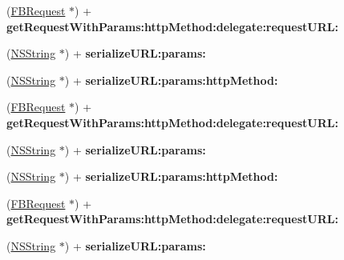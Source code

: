 \begin{DoxyCompactItemize}
\item 
\hypertarget{interface_f_b_request_ad72a5d444c91c0d8360b14c50ea050c4}{
(\hyperlink{interface_f_b_request}{\-F\-B\-Request} $\ast$) + {\bfseries get\-Request\-With\-Params\-:http\-Method\-:delegate\-:request\-U\-R\-L\-:}}
\label{interface_f_b_request_ad72a5d444c91c0d8360b14c50ea050c4}

\item 
\hypertarget{interface_f_b_request_aee7086d7ad0b6187567f27e50e5200f4}{
(\hyperlink{class_n_s_string}{\-N\-S\-String} $\ast$) + {\bfseries serialize\-U\-R\-L\-:params\-:}}
\label{interface_f_b_request_aee7086d7ad0b6187567f27e50e5200f4}

\item 
\hypertarget{interface_f_b_request_a4d464c3f3ee693fd58765836ac711dcd}{
(\hyperlink{class_n_s_string}{\-N\-S\-String} $\ast$) + {\bfseries serialize\-U\-R\-L\-:params\-:http\-Method\-:}}
\label{interface_f_b_request_a4d464c3f3ee693fd58765836ac711dcd}

\item 
\hypertarget{interface_f_b_request_ad72a5d444c91c0d8360b14c50ea050c4}{
(\hyperlink{interface_f_b_request}{\-F\-B\-Request} $\ast$) + {\bfseries get\-Request\-With\-Params\-:http\-Method\-:delegate\-:request\-U\-R\-L\-:}}
\label{interface_f_b_request_ad72a5d444c91c0d8360b14c50ea050c4}

\item 
\hypertarget{interface_f_b_request_aee7086d7ad0b6187567f27e50e5200f4}{
(\hyperlink{class_n_s_string}{\-N\-S\-String} $\ast$) + {\bfseries serialize\-U\-R\-L\-:params\-:}}
\label{interface_f_b_request_aee7086d7ad0b6187567f27e50e5200f4}

\item 
\hypertarget{interface_f_b_request_a4d464c3f3ee693fd58765836ac711dcd}{
(\hyperlink{class_n_s_string}{\-N\-S\-String} $\ast$) + {\bfseries serialize\-U\-R\-L\-:params\-:http\-Method\-:}}
\label{interface_f_b_request_a4d464c3f3ee693fd58765836ac711dcd}

\item 
\hypertarget{interface_f_b_request_ad72a5d444c91c0d8360b14c50ea050c4}{
(\hyperlink{interface_f_b_request}{\-F\-B\-Request} $\ast$) + {\bfseries get\-Request\-With\-Params\-:http\-Method\-:delegate\-:request\-U\-R\-L\-:}}
\label{interface_f_b_request_ad72a5d444c91c0d8360b14c50ea050c4}

\item 
\hypertarget{interface_f_b_request_aee7086d7ad0b6187567f27e50e5200f4}{
(\hyperlink{class_n_s_string}{\-N\-S\-String} $\ast$) + {\bfseries serialize\-U\-R\-L\-:params\-:}}
\label{interface_f_b_request_aee7086d7ad0b6187567f27e50e5200f4}


\end{DoxyCompactItemize}
